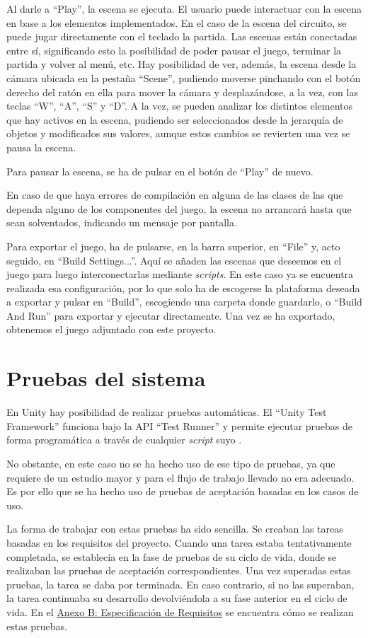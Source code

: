 Al darle a ``Play'', la escena se ejecuta. El usuario puede interactuar con la escena en base a los elementos implementados. En el caso de la escena del circuito, se puede jugar directamente con el teclado la partida. Las escenas están conectadas entre sí, significando esto la posibilidad de poder pausar el juego, terminar la partida y volver al menú, etc. Hay posibilidad de ver, además, la escena desde la cámara ubicada en la pestaña ``Scene'', pudiendo moverse pinchando con el botón derecho del ratón en ella para mover la cámara y desplazándose, a la vez, con las teclas ``W'', ``A'', ``S'' y ``D''. A la vez, se pueden analizar los distintos elementos que hay activos en la escena, pudiendo ser seleccionados desde la jerarquía de objetos y modificados sus valores, aunque estos cambios se revierten una vez se pausa la escena.

Para pausar la escena, se ha de pulsar en el botón de ``Play'' de nuevo.

En caso de que haya errores de compilación en alguna de las clases de las que dependa alguno de los componentes del juego, la escena no arrancará hasta que sean solventados, indicando un mensaje por pantalla.

Para exportar el juego, ha de pulsarse, en la barra superior, en ``File'' y, acto seguido, en ``Build Settings...''. Aquí se añaden las escenas que deseemos en el juego para luego interconectarlas mediante \textit{scripts}. En este caso ya se encuentra realizada esa configuración, por lo que solo ha de escogerse la plataforma deseada a exportar y pulsar en ``Build'', escogiendo una carpeta donde guardarlo, o ``Build And Run'' para exportar y ejecutar directamente. Una vez se ha exportado, obtenemos el juego adjuntado con este proyecto.

\section{Pruebas del sistema}

En Unity hay posibilidad de realizar pruebas automáticas. El ``Unity Test Framework'' funciona bajo la API ``Test Runner'' y permite ejecutar pruebas de forma programática a través de cualquier \textit{script} suyo \cite{testapi}.

No obstante, en este caso no se ha hecho uso de ese tipo de pruebas, ya que requiere de un estudio mayor y para el flujo de trabajo llevado no era adecuado. Es por ello que se ha hecho uso de pruebas de aceptación basadas en los casos de uso.

La forma de trabajar con estas pruebas ha sido sencilla. Se creaban las tareas basadas en los requisitos del proyecto. Cuando una tarea estaba tentativamente completada, se establecía en la fase de pruebas de su ciclo de vida, donde se realizaban las pruebas de aceptación correspondientes. Una vez superadas estas pruebas, la tarea se daba por terminada. En caso contrario, si no las superaban, la tarea continuaba su desarrollo devolviéndola a su fase anterior en el ciclo de vida. En el \hyperref[requisitos]{Anexo B: Especificación de Requisitos} se encuentra cómo se realizan estas pruebas.